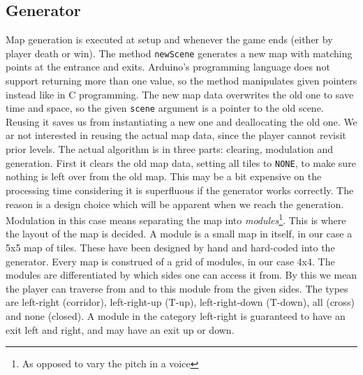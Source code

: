 \subsection{Generator} %
Map generation is executed at setup and whenever the game ends (either by player death or win). The method {\tt newScene} generates a new map with matching points at the entrance and exits. Arduino's programming language does not support returning more than one value, so the method manipulates given pointers instead like in C programming. The new map data overwrites the old one to save time and space, so the given {\tt scene} argument is a pointer to the old scene.  Reusing it saves us from instantiating a new one and deallocating the old one.  We ar not interested in reusing the actual map data, since the player cannot revisit prior levels.
\newline
The actual algorithm is in three parts: clearing, modulation and generation. First it clears the old map data, setting all tiles to {\tt NONE}, to make sure nothing is left over from the old map. This may be a bit expensive on the processing time considering it is superfluous if the generator works correctly. The reason is a design choice which will be apparent when we reach the generation. %
\newline
Modulation in this case means separating the map into \emph{modules}\footnote{As opposed to vary the pitch in a voice}. This is where the layout of the map is decided. A module is a small map in itself, in our case a 5x5 map of tiles.  These have been designed by hand and hard-coded into the generator. Every map is construed of a grid of modules, in our case 4x4. The modules are differentiated by which sides one can access it from.  By this we mean the player can traverse from and to this module from the given sides.  The types are left-right (corridor), left-right-up (T-up), left-right-down (T-down), all (cross) and none (closed). A module in the category left-right is guaranteed to have an exit left and right, and may have an exit up or down.
\newline
